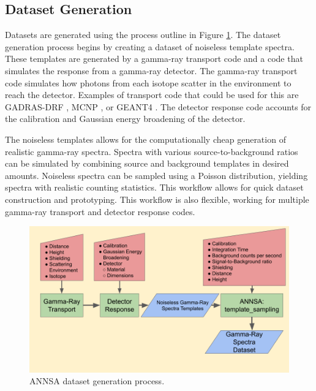 \subsection{Dataset Generation}

Datasets are generated using the process outline in Figure \ref{fig:annsa_data_generation}. The dataset generation process begins by creating a dataset of noiseless template spectra. These templates are generated by a gamma-ray transport code and a code that simulates the response from a gamma-ray detector. The gamma-ray transport code simulates how photons from each isotope scatter in the environment to reach the detector. Examples of transport code that could be used for this are GADRAS-DRF \cite{mitchell2014}, MCNP \cite{Goorley2016}, or GEANT4 \cite{geant4}. The detector response code accounts for the calibration and Gaussian energy broadening of the detector. 

The noiseless templates allows for the computationally cheap generation of realistic gamma-ray spectra. Spectra with various source-to-background ratios can be simulated by combining source and background templates in desired amounts. Noiseless spectra can be sampled using a Poisson distribution, yielding spectra with realistic counting statistics. This workflow allows for quick dataset construction and prototyping. This workflow is also flexible, working for multiple gamma-ray transport and detector response codes.


\begin{figure}[H]
\centering
\includegraphics[trim=40 50 10 0,clip,width=1.0\linewidth]{images/annsa_data_generation.png}
\caption{ANNSA dataset generation process.}
\label{fig:annsa_data_generation}
\end{figure}

